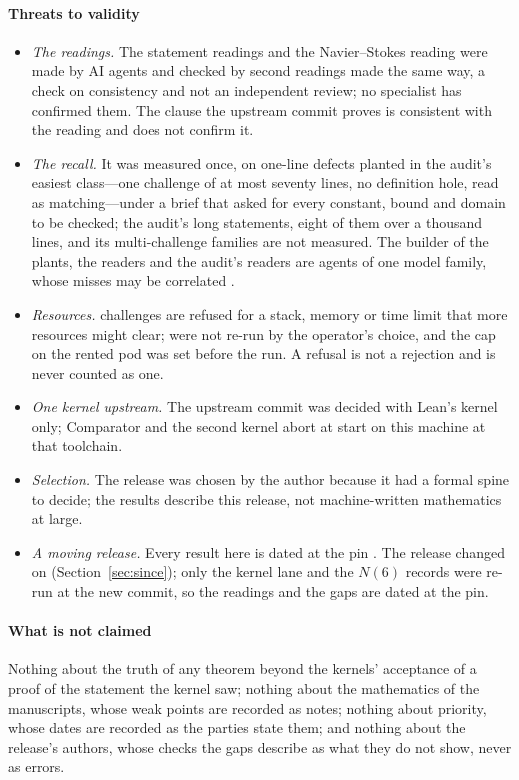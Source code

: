 \documentclass[preprint,11pt,authoryear,a4paper]{elsarticle}
\begin{document}
\paragraph{Threats to validity}\label{sec:threats}
\begin{itemize}
\item \emph{The readings.} The statement readings and the Navier--Stokes reading were made by AI agents and checked by second readings made the same way, a check on consistency and not an independent review; no specialist has confirmed them. The clause the upstream commit proves is consistent with the reading and does not confirm it.
\item \emph{The recall.} It was measured once, on \MtRrPlants{} one-line defects planted in the audit's easiest class---one challenge of at most seventy lines, no definition hole, read as matching---under a brief that asked for every constant, bound and domain to be checked; the audit's long statements, eight of them over a thousand lines, and its multi-challenge families are not measured. The builder of the plants, the readers and the audit's readers are agents of one model family, whose misses may be correlated \citep{KnightLeveson86}.
\item \emph{Resources.} \MtOaRefused{} challenges are refused for a stack, memory or time limit that more resources might clear; \OmNotRerun{} were not re-run by the operator's choice, and the cap on the rented pod was set before the run. A refusal is not a rejection and is never counted as one.
\item \emph{One kernel upstream.} The upstream commit was decided with Lean's kernel only; Comparator and the second kernel abort at start on this machine at that toolchain.
\item \emph{Selection.} The release was chosen by the author because it had a formal spine to decide; the results describe this release, not machine-written mathematics at large.
\item \emph{A moving release.} Every result here is dated at the pin \MtOaCommit. The release changed on \OmNextDate{} (Section~\ref{sec:since}); only the kernel lane and the $N(6)$ records were re-run at the new commit, so the readings and the gaps are dated at the pin.
\end{itemize}

\paragraph{What is not claimed} Nothing about the truth of any theorem beyond the kernels' acceptance of a proof of the statement the kernel saw; nothing about the mathematics of the manuscripts, whose weak points are recorded as notes; nothing about priority, whose dates are recorded as the parties state them; and nothing about the release's authors, whose checks the gaps describe as what they do not show, never as errors.
\end{document}
